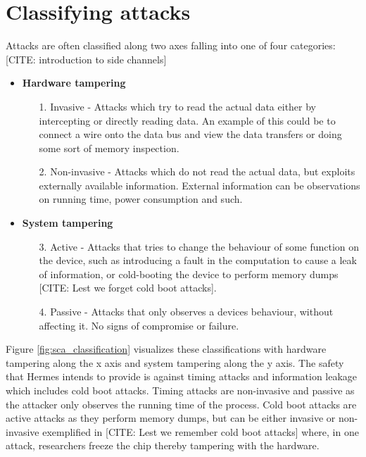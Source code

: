 \section{Classifying attacks}
Attacks are often classified along two axes falling into one of four categories: [CITE: introduction to side channels]

\begin{itemize}
  \item \textbf{Hardware tampering}
    \begin{itemize}
      \item[1.] Invasive - Attacks which try to read the actual data either by intercepting or directly reading data. An example of this could be to connect a wire onto the data bus and view the data transfers or doing some sort of memory inspection.
      \item[2.] Non-invasive - Attacks which do not read the actual data, but exploits externally available information. External information can be observations on running time, power consumption and such.
    \end{itemize}
  \item \textbf{System tampering}
    \begin{itemize}
      \item[3.] Active - Attacks that tries to change the behaviour of some function on the device, such as introducing a fault in the computation to cause a leak of information, or cold-booting the device to perform memory dumps [CITE: Lest we forget cold boot attacks].
      \item[4.] Passive - Attacks that only observes a devices behaviour, without affecting it. No signs of compromise or failure.
    \end{itemize}
\end{itemize}

Figure \ref{fig:sca_classification} visualizes these classifications with hardware tampering along the x axis and system tampering along the y axis.
The safety that Hermes intends to provide is against timing attacks and information leakage which includes cold boot attacks.
Timing attacks are non-invasive and passive as the attacker only observes the running time of the process.
Cold boot attacks are active attacks as they perform memory dumps, but can be either invasive or non-invasive exemplified in [CITE: Lest we remember cold boot attacks] where, in one attack, researchers freeze the chip thereby tampering with the hardware.


